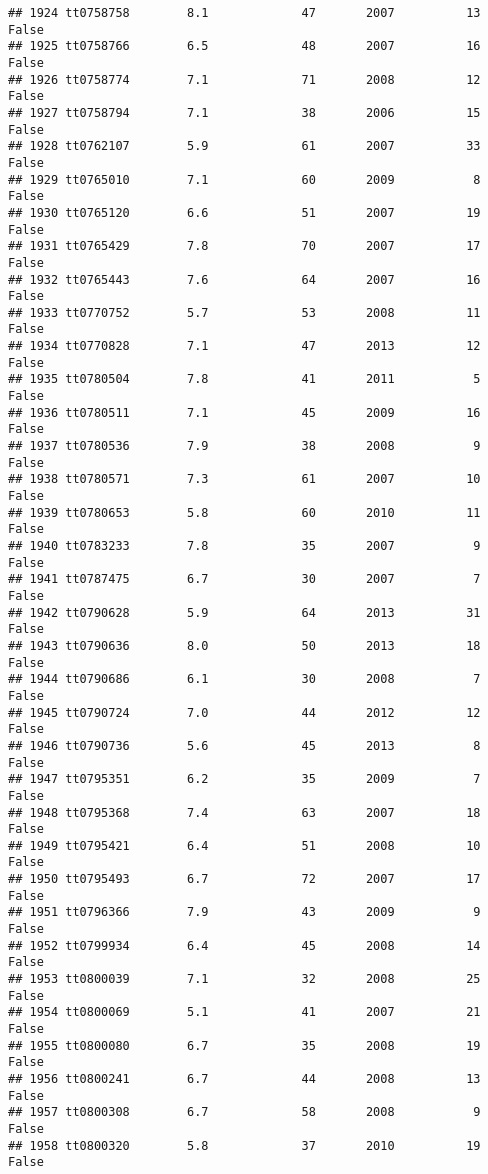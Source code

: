 \documentclass[
]{article}
\begin{document}
\begin{verbatim}
## 1924 tt0758758        8.1             47       2007          13   False
## 1925 tt0758766        6.5             48       2007          16   False
## 1926 tt0758774        7.1             71       2008          12   False
## 1927 tt0758794        7.1             38       2006          15   False
## 1928 tt0762107        5.9             61       2007          33   False
## 1929 tt0765010        7.1             60       2009           8   False
## 1930 tt0765120        6.6             51       2007          19   False
## 1931 tt0765429        7.8             70       2007          17   False
## 1932 tt0765443        7.6             64       2007          16   False
## 1933 tt0770752        5.7             53       2008          11   False
## 1934 tt0770828        7.1             47       2013          12   False
## 1935 tt0780504        7.8             41       2011           5   False
## 1936 tt0780511        7.1             45       2009          16   False
## 1937 tt0780536        7.9             38       2008           9   False
## 1938 tt0780571        7.3             61       2007          10   False
## 1939 tt0780653        5.8             60       2010          11   False
## 1940 tt0783233        7.8             35       2007           9   False
## 1941 tt0787475        6.7             30       2007           7   False
## 1942 tt0790628        5.9             64       2013          31   False
## 1943 tt0790636        8.0             50       2013          18   False
## 1944 tt0790686        6.1             30       2008           7   False
## 1945 tt0790724        7.0             44       2012          12   False
## 1946 tt0790736        5.6             45       2013           8   False
## 1947 tt0795351        6.2             35       2009           7   False
## 1948 tt0795368        7.4             63       2007          18   False
## 1949 tt0795421        6.4             51       2008          10   False
## 1950 tt0795493        6.7             72       2007          17   False
## 1951 tt0796366        7.9             43       2009           9   False
## 1952 tt0799934        6.4             45       2008          14   False
## 1953 tt0800039        7.1             32       2008          25   False
## 1954 tt0800069        5.1             41       2007          21   False
## 1955 tt0800080        6.7             35       2008          19   False
## 1956 tt0800241        6.7             44       2008          13   False
## 1957 tt0800308        6.7             58       2008           9   False
## 1958 tt0800320        5.8             37       2010          19   False

\end{verbatim}
\end{document}
